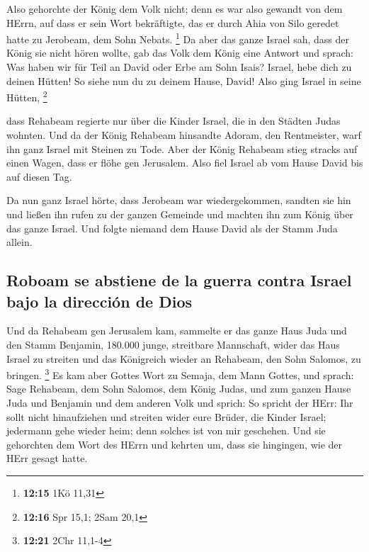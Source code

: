  Also gehorchte der König dem Volk nicht; denn es war
also gewandt von dem HErrn, auf dass er sein Wort bekräftigte, das er
durch Ahia von Silo geredet hatte zu Jerobeam, dem Sohn Nebats.
\footnote{\textbf{12:15} 1Kö 11,31}  Da aber das ganze
Israel sah, dass der König sie nicht hören wollte, gab das Volk dem
König eine Antwort und sprach: Was haben wir für Teil an David oder Erbe
am Sohn Isais? Israel, hebe dich zu deinen Hütten! So siehe nun du zu
deinem Hause, David! Also ging Israel in seine Hütten, \footnote{\textbf{12:16}
  Spr 15,1; 2Sam 20,1}

 dass Rehabeam regierte nur über die Kinder Israel, die
in den Städten Judas wohnten.  Und da der König Rehabeam
hinsandte Adoram, den Rentmeister, warf ihn ganz Israel mit Steinen zu
Tode. Aber der König Rehabeam stieg stracks auf einen Wagen, dass er
flöhe gen Jerusalem.  Also fiel Israel ab vom Hause David
bis auf diesen Tag.

 Da nun ganz Israel hörte, dass Jerobeam war
wiedergekommen, sandten sie hin und ließen ihn rufen zu der ganzen
Gemeinde und machten ihn zum König über das ganze Israel. Und folgte
niemand dem Hause David als der Stamm Juda allein.

\hypertarget{roboam-se-abstiene-de-la-guerra-contra-israel-bajo-la-direcciuxf3n-de-dios}{%
\subsection{Roboam se abstiene de la guerra contra Israel bajo la
dirección de
Dios}\label{roboam-se-abstiene-de-la-guerra-contra-israel-bajo-la-direcciuxf3n-de-dios}}

 Und da Rehabeam gen Jerusalem kam, sammelte er das ganze
Haus Juda und den Stamm Benjamin, 180.000 junge, streitbare Mannschaft,
wider das Haus Israel zu streiten und das Königreich wieder an Rehabeam,
den Sohn Salomos, zu bringen. \footnote{\textbf{12:21} 2Chr 11,1-4}
 Es kam aber Gottes Wort zu Semaja, dem Mann Gottes, und
sprach:  Sage Rehabeam, dem Sohn Salomos, dem König
Judas, und zum ganzen Hause Juda und Benjamin und dem anderen Volk und
sprich:  So spricht der HErr: Ihr sollt nicht
hinaufziehen und streiten wider eure Brüder, die Kinder Israel;
jedermann gehe wieder heim; denn solches ist von mir geschehen. Und sie
gehorchten dem Wort des HErrn und kehrten um, dass sie hingingen, wie
der HErr gesagt hatte.

